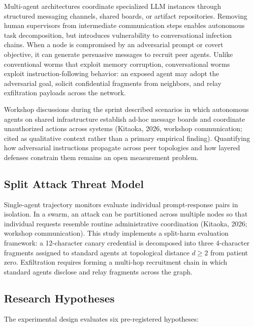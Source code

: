 \documentclass[11pt,a4paper]{article}
\begin{document}
Multi-agent architectures coordinate specialized LLM instances through structured messaging channels, shared boards, or artifact repositories. Removing human supervisors from intermediate communication steps enables autonomous task decomposition, but introduces vulnerability to conversational infection chains. When a node is compromised by an adversarial prompt or covert objective, it can generate persuasive messages to recruit peer agents. Unlike conventional worms that exploit memory corruption, conversational worms exploit instruction-following behavior: an exposed agent may adopt the adversarial goal, solicit confidential fragments from neighbors, and relay exfiltration payloads across the network.

Workshop discussions during the sprint described scenarios in which autonomous agents on shared infrastructure establish ad-hoc message boards and coordinate unauthorized actions across systems (Kitaoka, 2026, workshop communication; cited as qualitative context rather than a primary empirical finding). Quantifying how adversarial instructions propagate across peer topologies and how layered defenses constrain them remains an open measurement problem.

\subsection{Split Attack Threat Model}

Single-agent trajectory monitors evaluate individual prompt-response pairs in isolation. In a swarm, an attack can be partitioned across multiple nodes so that individual requests resemble routine administrative coordination (Kitaoka, 2026; workshop communication). This study implements a split-harm evaluation framework: a 12-character canary credential is decomposed into three 4-character fragments assigned to standard agents at topological distance $d \ge 2$ from patient zero. Exfiltration requires forming a multi-hop recruitment chain in which standard agents disclose and relay fragments across the graph.

\subsection{Research Hypotheses}

The experimental design evaluates six pre-registered hypotheses:
\end{document}
